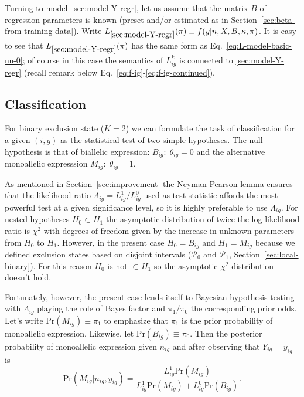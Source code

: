 \documentclass[letterpaper]{article}
\begin{document}
Turning to model~\ref{sec:model-Y-regr}, let us assume that the matrix \(B\)
of regression parameters is known (preset and/or estimated as in
Section~\ref{sec:beta-from-training-data}).  Write
\(L_{\ref{sec:model-Y-regr}}(\pi)\equiv f(y|n,X,B,\kappa,\pi)\).  It is easy
to see that \(L_{\ref{sec:model-Y-regr}}(\pi)\) has the same form as
Eq.~\ref{eq:L-model-basic-nu-0}; of course in this case the semantics of
\(L_{ig}^k\) is connected to \ref{sec:model-Y-regr} (recall remark below
Eq.~\ref{eq:f-ig}-\ref{eq:f-ig-continued}).

\subsection{Classification}
\label{sec:classification}

For binary exclusion state (\(K=2\)) we can
formulate the task of classification for a given \((i,g)\) as the statistical test of two simple
hypotheses.  The null hypothesis is that of biallelic expression: \(B_{ig} :\;
\theta_{ig}=0\) and the alternative monoallelic expresssion \(M_{ig} :\; \theta_{ig}=1\).

As mentioned in Section~\ref{sec:improvement} the Neyman-Pearson lemma ensures
that the likelihood ratio \(\Lambda_{ig}=L_{ig}^1/L_{ig}^0\) used as test
statistic affords the most powerful test at a given significance level, so it
is highly preferable to use \(\Lambda_{ig}\).  For nested hypotheses
\(H_0\subset H_1\) the asymptotic distribution of twice the log-likelihood
ratio is \(\chi^2\) with degrees of freedom given by the increase in unknown
parameters from \(H_0\) to \(H_1\).  However, in the present case
\(H_0=B_{ig}\) and \(H_1=M_{ig}\) because we defined exclusion states based on
disjoint intervals (\(\mathcal{P}_0\) and \(\mathcal{P}_1\),
Section~\ref{sec:local-binary}).  For this reason \(H_0\) is not \(\subset H_1\)
so the asymptotic \(\chi^2\) distribution doesn't hold.

Fortunately, however, the present case lends itself to Bayesian hypothesis
testing with \(\Lambda_{ig}\) playing the role of Bayes factor and
\(\pi_1/\pi_0\) the corresponding prior odds.  Let's write
\(\mathrm{Pr}(M_{ig})\equiv\pi_1\) to emphasize that \(\pi_1\) is the prior
probability of monoallelic expression. Likewise, let
\(\mathrm{Pr}(B_{ig})\equiv\pi_0\).  Then the posterior probability of
monoallelic expression given \(n_{ig}\) and after observing that
\(Y_{ig}=y_{ig}\) is
\begin{equation}
\label{eq:hypothesis-posterior}
\mathrm{Pr}(M_{ig}|n_{ig},y_{ig}) =
\frac{L_{ig}^1 \mathrm{Pr}(M_{ig})}{{L_{ig}^1 \mathrm{Pr}(M_{ig})} + {L_{ig}^0
\mathrm{Pr}(B_{ig})}}.
\end{equation}
\end{document}
